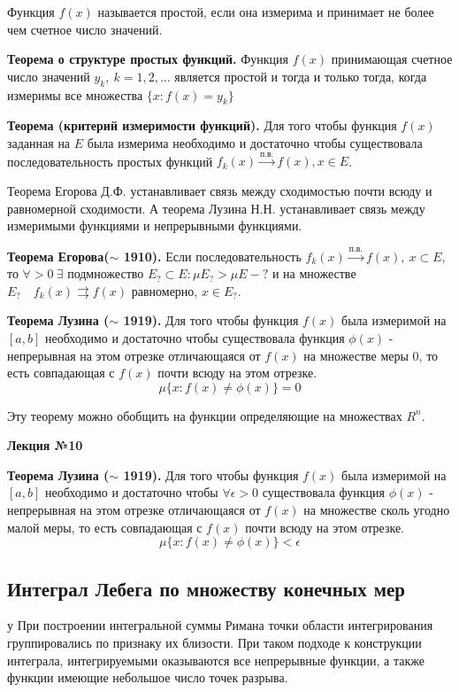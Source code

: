 \documentclass[14pt,a4paper]{extarticle}
\theoremstyle{definition}
\theoremstyle{remark}
\renewcommand{\[}{\begin{dmath*}[compact]}
\renewcommand{\]}{\end{dmath*}}
\newcommand{\sep}{ , \ \allowbreak }
\newcommand{\tth}[1][]{\textbf{Теорема#1.}}
\begin{document}
Функция $f(x)$ называется простой, если она измерима и принимает не более чем счетное число значений.

\tth[ о структуре простых функций] Функция $f(x)$ принимающая счетное число значений $y_k\sep k=1,2,\dots$ является простой и тогда и только тогда, когда измеримы все множества $\{x: f(x) = y_k \}$

\tth[ (критерий измеримости функций)] Для того чтобы функция $f(x)$ заданная на $E$ была измерима необходимо и достаточно чтобы существовала последовательность простых функций $f_k (x) \xrightarrow{\text{п.в.}} f(x), x \in E$.

Теорема Егорова Д.Ф. устанавливает связь между сходимостью почти всюду и равномерной сходимости. А теорема Лузина Н.Н. устанавливает связь между измеримыми функциями и непрерывными функциями.

\tth[ Егорова($\sim$ 1910)] Если последовательность $f_k(x) \xrightarrow{п.в.} f(x) \sep x \subset E$, то $\forall  > 0 \ \exists$ подмножество $ E_? \subset E : \mu E_? > \mu E - ? $ и на множестве $E_? \quad f_k(x) \rightrightarrows f(x)$ равномерно, $x \in E_?$.

\tth[ Лузина ($\sim$ 1919)] Для того чтобы функция $f(x)$ была измеримой на $[a,b]$ необходимо и достаточно чтобы существовала функция $\phi(x)$ - непрерывная на этом отрезке отличающаяся от $f(x)$ на множестве меры 0, то есть совпадающая с $f(x)$ почти всюду на этом отрезке.
\[\mu\{x:f(x) \neq \phi (x)\} = 0\]

Эту теорему можно обобщить на функции определяющие на множествах $R^n$.

\textbf{Лекция №10}

\tth[ Лузина ($\sim$ 1919)] Для того чтобы функция $f(x)$ была измеримой на $[a,b]$ необходимо и достаточно чтобы $\forall \epsilon > 0$ существовала функция $\phi(x)$ - непрерывная на этом отрезке отличающаяся от $f(x)$ на множестве сколь угодно малой меры, то есть совпадающая с $f(x)$ почти всюду на этом отрезке.
\[\mu\{x:f(x) \neq \phi (x)\} < \epsilon\]

\subsection{Интеграл Лебега по множеству конечных мер}
у
При построении интегральной суммы Римана точки области интегрирования группировались по признаку их близости. При таком подходе к конструкции интеграла, интегрируемыми оказываются все непрерывные функции, а также функции имеющие небольшое число точек разрыва.
\end{document}
